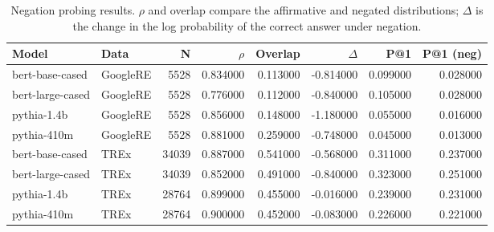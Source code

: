 \begin{table}
\caption{Negation probing results. $\rho$ and overlap compare the affirmative and negated distributions; $\Delta$ is the change in the log probability of the correct answer under negation.}
\label{tab:main}
\begin{tabular}{llrrrrrr}
\toprule
Model & Data & N & $\rho$ & Overlap & $\Delta$ & P@1 & P@1 (neg) \\
\midrule
bert-base-cased & GoogleRE & 5528 & 0.834000 & 0.113000 & -0.814000 & 0.099000 & 0.028000 \\
bert-large-cased & GoogleRE & 5528 & 0.776000 & 0.112000 & -0.840000 & 0.105000 & 0.028000 \\
pythia-1.4b & GoogleRE & 5528 & 0.856000 & 0.148000 & -1.180000 & 0.055000 & 0.016000 \\
pythia-410m & GoogleRE & 5528 & 0.881000 & 0.259000 & -0.748000 & 0.045000 & 0.013000 \\
bert-base-cased & TREx & 34039 & 0.887000 & 0.541000 & -0.568000 & 0.311000 & 0.237000 \\
bert-large-cased & TREx & 34039 & 0.852000 & 0.491000 & -0.840000 & 0.323000 & 0.251000 \\
pythia-1.4b & TREx & 28764 & 0.899000 & 0.455000 & -0.016000 & 0.239000 & 0.231000 \\
pythia-410m & TREx & 28764 & 0.900000 & 0.452000 & -0.083000 & 0.226000 & 0.221000 \\
\bottomrule
\end{tabular}
\end{table}
